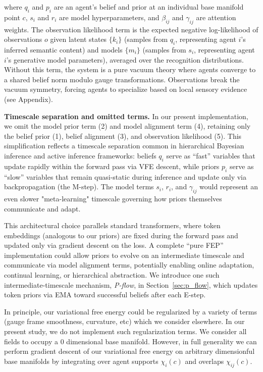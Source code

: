 \documentclass[twoside,11pt]{article}
\begin{document}
where $q_i$ and $p_i$ are an agent's belief and prior at an individual base manifold point $c$, $s_i$ and $r_i$ are model hyperparameters, and $\beta_{ij}$ and $\gamma_{ij}$ are attention weights. The observation likelihood term is the expected negative log-likelihood of observations $o$ given latent states $\{k_i\}$ (samples from $q_i$, representing agent $i$'s inferred semantic content) and models $\{m_i\}$ (samples from $s_i$, representing agent $i$'s generative model parameters), averaged over the recognition distributions. Without this term, the system is a pure vacuum theory where agents converge to a shared belief norm modulo gauge transformations. Observations break the vacuum symmetry, forcing agents to specialize based on local sensory evidence (see Appendix).

\textbf{Timescale separation and omitted terms.} In our present implementation, we omit the model prior term (2) and model alignment term (4), retaining only the belief prior (1), belief alignment (3), and observation likelihood (5). This simplification reflects a timescale separation common in hierarchical Bayesian inference and active inference frameworks: beliefs $q_i$ serve as ``fast'' variables that update rapidly within the forward pass via VFE descent, while priors $p_i$ serve as ``slow'' variables that remain quasi-static during inference and update only via backpropagation (the M-step). The model terms $s_i$, $r_i$, and $\gamma_{ij}$ would represent an even slower "meta-learning" timescale governing how priors themselves communicate and adapt.

This architectural choice parallels standard transformers, where token embeddings (analogous to our priors) are fixed during the forward pass and updated only via gradient descent on the loss. A complete ``pure FEP'' implementation could allow priors to evolve on an intermediate timescale and communicate via model alignment terms, potentially enabling online adaptation, continual learning, or hierarchical abstraction. We introduce one such intermediate-timescale mechanism, \emph{P-flow}, in Section~\ref{sec:p_flow}, which updates token priors via EMA toward successful beliefs after each E-step.

In principle, our variational free energy could be regularized by a variety of terms (gauge frame smoothness, curvature, etc) which we consider elsewhere. In our present study, we do not implement such regularization terms. We consider all fields to occupy a $0$ dimensional base manifold. However, in full generality we can perform gradient descent of our variational free energy on arbitrary dimensionful base manifolds by integrating over agent supports $\chi_i(c)$ and overlaps $\chi_{ij}(c)$.
\end{document}
